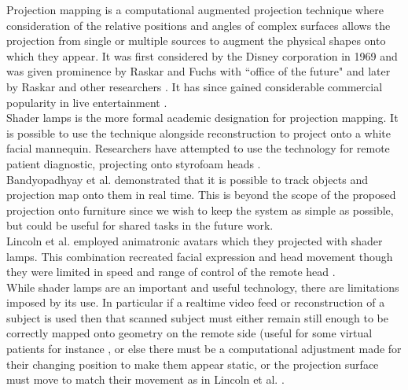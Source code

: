 Projection mapping is a computational augmented projection technique where consideration of the relative positions and angles of complex surfaces allows the projection from single or multiple sources to augment the physical shapes onto which they appear. It was first considered by the Disney corporation in 1969 \cite{projectionmappingweb2013} and was given prominence by Raskar and Fuchs with ``office of the future" \cite{Raskar1998} and later by Raskar and other researchers \cite{Low2001, Raskar2001a}. It has since gained considerable commercial popularity in live entertainment \cite{googleStatsProjectionMapping}.\\
                    Shader lamps \cite{Raskar2001a} is the more formal academic designation for projection mapping. It is possible to use the technique alongside reconstruction to project onto a white facial mannequin. Researchers have attempted to use the technology for remote patient diagnostic, projecting onto styrofoam heads  \cite{Rivera-Gutierrez2012}.\\          
                     Bandyopadhyay et al. demonstrated \cite{Bandyopadhyay} that it is possible to track objects and projection map \cite{Dalsgaard2011} onto them in real time. This is beyond the scope of the proposed projection onto furniture since we wish to keep the system as simple as possible, but could be useful for shared tasks in the future work.\\
                    Lincoln et al. employed animatronic avatars which they projected with shader lamps. This combination recreated facial expression and head movement though they were limited in speed and range of control of the remote head \cite{Lincoln:2010it}.\\
                    While shader lamps are an important and useful technology, there are limitations imposed by its use. In particular if a realtime video feed or reconstruction of a subject is used then that scanned subject must either remain still enough to be correctly mapped onto geometry on the remote side (useful for some virtual patients for instance \cite{Benjamin2012}, or else there must be a computational adjustment made for their changing position to make them appear static, or the projection surface must move to match their movement as in Lincoln et al. .
   
